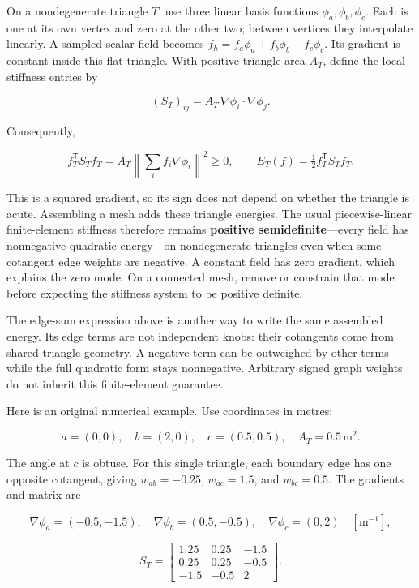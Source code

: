 On a nondegenerate triangle \(T\), use three linear basis functions \(\phi_a,\phi_b,\phi_c\). Each is one at its own vertex and zero at the other two; between vertices they interpolate linearly. A sampled scalar field becomes \(f_h=f_a\phi_a+f_b\phi_b+f_c\phi_c\). Its gradient is constant inside this flat triangle. With positive triangle area \(A_T\), define the local stiffness entries by

\[
(S_T)_{ij}=A_T\,\nabla\phi_i\cdot\nabla\phi_j.
\]

Consequently,

\[
f_T^{\mathsf T}S_Tf_T
=A_T\left\|\sum_i f_i\nabla\phi_i\right\|^2\geq0,
\qquad E_T(f)=\tfrac12f_T^{\mathsf T}S_Tf_T.
\]

This is a squared gradient, so its sign does not depend on whether the triangle is acute. Assembling a mesh adds these triangle energies. The usual piecewise-linear finite-element stiffness therefore remains \textbf{positive semidefinite}---every field has nonnegative quadratic energy---on nondegenerate triangles even when some cotangent edge weights are negative. A constant field has zero gradient, which explains the zero mode. On a connected mesh, remove or constrain that mode before expecting the stiffness system to be positive definite.

The edge-sum expression above is another way to write the same assembled energy. Its edge terms are not independent knobs: their cotangents come from shared triangle geometry. A negative term can be outweighed by other terms while the full quadratic form stays nonnegative. Arbitrary signed graph weights do not inherit this finite-element guarantee.

Here is an original numerical example. Use coordinates in metres:

\[
a=(0,0),\quad b=(2,0),\quad c=(0.5,0.5),\quad A_T=0.5\,\mathrm{m^2}.
\]

The angle at \(c\) is obtuse. For this single triangle, each boundary edge has one opposite cotangent, giving \(w_{ab}=-0.25\), \(w_{ac}=1.5\), and \(w_{bc}=0.5\). The gradients and matrix are

\[
\nabla\phi_a=(-0.5,-1.5),\quad
\nabla\phi_b=(0.5,-0.5),\quad
\nabla\phi_c=(0,2)\quad[\mathrm{m^{-1}}],
\]

\[
S_T=
\begin{bmatrix}
1.25&0.25&-1.5\\
0.25&0.25&-0.5\\
-1.5&-0.5&2
\end{bmatrix}.
\]


